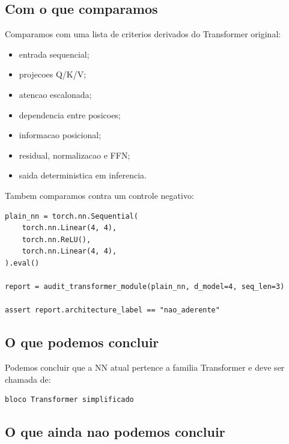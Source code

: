 \subsection{Com o que comparamos}



Comparamos com uma lista de criterios derivados do Transformer original:


\begin{itemize}
\item entrada sequencial;
\item projecoes Q/K/V;
\item atencao escalonada;
\item dependencia entre posicoes;
\item informacao posicional;
\item residual, normalizacao e FFN;
\item saida deterministica em inferencia.
\end{itemize}


Tambem comparamos contra um controle negativo:



\begin{Verbatim}[fontsize=\small,breaklines=true,label=python]
plain_nn = torch.nn.Sequential(
    torch.nn.Linear(4, 4),
    torch.nn.ReLU(),
    torch.nn.Linear(4, 4),
).eval()

report = audit_transformer_module(plain_nn, d_model=4, seq_len=3)

assert report.architecture_label == "nao_aderente"
\end{Verbatim}



\subsection{O que podemos concluir}




Podemos concluir que a NN atual pertence a familia Transformer e deve ser chamada de:



\begin{Verbatim}[fontsize=\small,breaklines=true,label=text]
bloco Transformer simplificado
\end{Verbatim}



\subsection{O que ainda nao podemos concluir}





